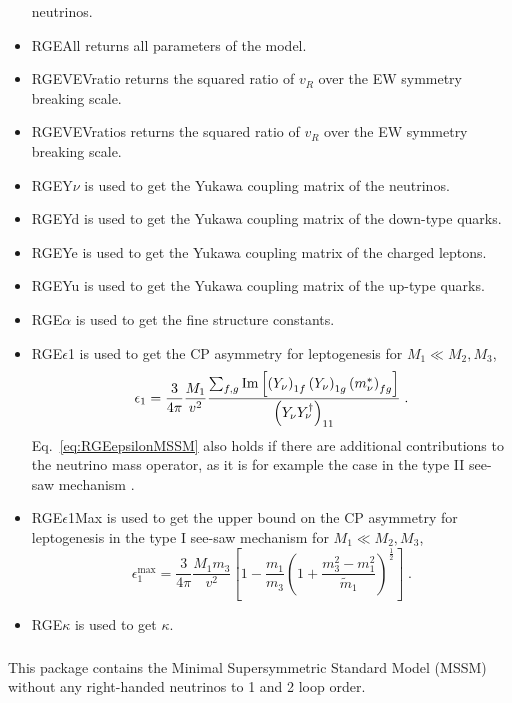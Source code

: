 \documentclass[10pt,a4paper,twoside]{scrartcl}
\begin{document}
\begin{itemize}
neutrinos.
\item 
RGEAll returns all parameters of the model.
\item 
RGEVEVratio returns the squared ratio of $v_R$ over the EW symmetry breaking scale.
\item 
RGEVEVratios returns the squared ratio of $v_R$ over the EW symmetry breaking scale.
\item 
RGEY$\nu$ is used to get the Yukawa coupling matrix of the neutrinos.
\item 
RGEYd is used to get the Yukawa coupling matrix of the down-type quarks.
\item 
 RGEYe is used to get the Yukawa coupling matrix of the charged leptons.
\item 
RGEYu is used to get the Yukawa coupling matrix of the up-type quarks.
\item 
RGE$\alpha$ is used to get the fine structure constants.
\item 
RGE$\epsilon$1 is used to get the CP asymmetry \cite{Covi:1996wh} for 
leptogenesis for $M_1 \ll M_2, M_3$,
   \begin{equation}
     \epsilon_1=\frac{3}{4\pi}\frac{M_1}{v^2}
     \frac{\sum_{f,g}\operatorname{Im}\left[\left(Y_\nu\right)_{1f}\left(Y_\nu\right)_{1g}
     \left(m^*_\nu\right)_{fg}\right]}{\left(Y_\nu Y_\nu^\dagger\right)_{11}}\;. \label{eq:RGEepsilonMSSM}
   \end{equation}
   Eq.~\eqref{eq:RGEepsilonMSSM} 
also holds if there are additional contributions to the neutrino mass operator, as it is for example 
the case in the type II see-saw mechanism \cite{Antusch:2004xy}.
\item 
RGE$\epsilon$1Max is used to get the upper bound \cite{Buchmuller:2003gz} 
on the CP asymmetry for leptogenesis in the type I see-saw mechanism 
for $M_1 \ll M_2, M_3$,
  \begin{equation}
    \epsilon_1^\text{max}=\frac{3}{4\pi}\frac{M_1 m_3}{v^2}\left[1-\frac{m_1}{m_3}\left(1+\frac{m_3^2-m_1^2}{\widetilde{m}_1}\right)^\frac{1}{2}\right]\;.
  \end{equation}
\item 
RGE$\kappa$ is used to get $\kappa$.

\end{itemize}

\subsubsection[\package{RGEMSSM0N}]{}
This package contains the Minimal Supersymmetric Standard Model (MSSM) without
any right-handed neutrinos to 1 and 2 loop order.
\end{document}
